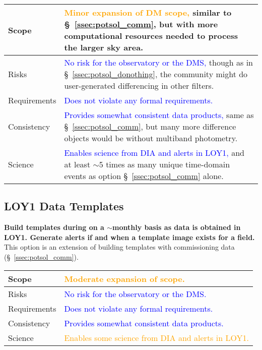 \documentclass[DM,lsstdraft,toc]{lsstdoc}
\begin{document}
\begin{center}
\begin{tabular}{|p{2.5cm}|p{13cm}|}
\hline
Scope & \textcolor{orange}{Minor expansion of DM scope,} similar to \S~\ref{ssec:potsol_comm}, but with more computational resources needed to process the larger sky area.  \\
\hline
Risks & \textcolor{blue}{No risk for the observatory or the DMS,} though as in \S~\ref{ssec:potsol_donothing}, the community might do user-generated differencing in other filters. \\
\hline
Requirements & \textcolor{blue}{Does not violate any formal requirements.} \\
\hline
Consistency & \textcolor{blue}{Provides somewhat consistent data products,} same as \S~\ref{ssec:potsol_comm}, but many more difference objects would be without multiband photometry.  \\
\hline
Science & \textcolor{blue}{Enables science from DIA and alerts in LOY1,} and at least $\sim$5 times as many unique time-domain events as option \S~\ref{ssec:potsol_comm} alone. \\
\hline
\end{tabular}
\end{center}

\clearpage
\subsection{LOY1 Data Templates}\label{ssec:potsol_cont}

{\bf Build templates during on a $\sim$monthly basis as data is obtained in LOY1. Generate alerts if and when a template image exists for a field.} This option is an extension of building templates with commissioning data (\S~\ref{ssec:potsol_comm}).

\begin{center}
\begin{tabular}{|p{2.5cm}|p{13cm}|}
\hline
Scope & \textcolor{orange}{Moderate expansion of scope.} \\
\hline
Risks & \textcolor{blue}{No risk for the observatory or the DMS.} \\
\hline
Requirements & \textcolor{blue}{Does not violate any formal requirements.} \\
\hline
Consistency & \textcolor{blue}{Provides somewhat consistent data products.} \\
\hline
Science & \textcolor{orange}{Enables some science from DIA and alerts in LOY1.} \\
\hline
\end{tabular}
\end{center}
\end{document}
